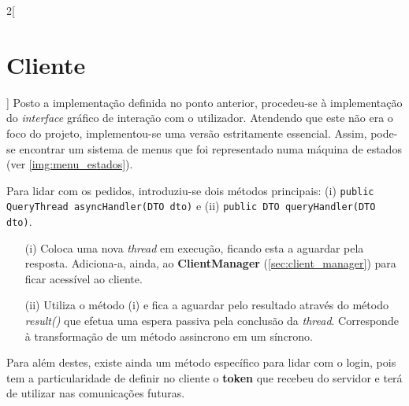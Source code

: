 \documentclass[a4paper,11pt]{scrreprt}
\begin{document}
\begin{multicols}{2}[\section{Cliente}]
    Posto a implementação definida no ponto anterior, procedeu-se à implementação
    do \textit{interface} gráfico de interação com o utilizador.
    Atendendo que este não era o foco do projeto, implementou-se uma versão estritamente
    essencial.
    Assim, pode-se encontrar um sistema de menus que foi representado numa máquina
    de estados (ver \ref{img:menu_estados}).
    
    Para lidar com os pedidos, introduziu-se dois métodos principais: (i) \texttt{public QueryThread asyncHandler(DTO dto)}
    e (ii) \texttt{public DTO queryHandler(DTO dto)}.
    \begin{itemize}
        \item[(i)]{
              Coloca uma nova \textit{thread} em execução, ficando esta a aguardar pela resposta.
              Adiciona-a, ainda, ao \textbf{ClientManager} (\ref{sec:client_manager}) para ficar acessível
              ao cliente.
              }
        \item[(ii)]{
              Utiliza o método (i) e fica a aguardar pelo resultado através do método
              \textit{result()} que efetua uma espera passiva pela conclusão da \textit{thread}.
              Corresponde à transformação de um método assincrono em um síncrono.
              }
    \end{itemize}
    Para além destes, existe ainda um método específico para lidar com o login,
    pois tem a particularidade de definir no cliente o \textbf{token} que recebeu
    do servidor e terá de utilizar nas comunicações futuras.
    

\end{multicols}
\end{document}
